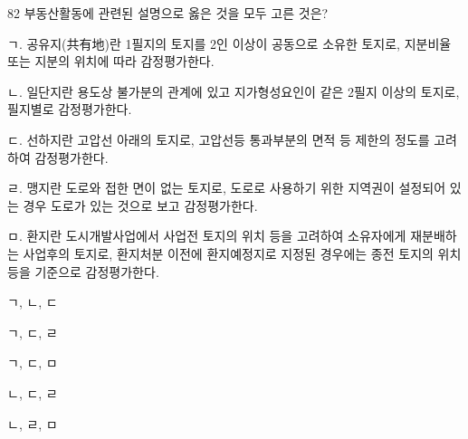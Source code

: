 \begin{question}{82}
부동산활동에 관련된 설명으로 옳은 것을 모두 고른 것은?
\begin{framedtext}
ㄱ. 공유지(共有地)란 1필지의 토지를 2인 이상이 공동으로 소유한 토지로, 지분비율 또는 지분의 위치에 따라 감정평가한다. \par
ㄴ. 일단지란 용도상 불가분의 관계에 있고 지가형성요인이 같은 2필지 이상의 토지로, 필지별로 감정평가한다. \par
ㄷ. 선하지란 고압선 아래의 토지로, 고압선등 통과부분의 면적 등 제한의 정도를 고려하여 감정평가한다. \par
ㄹ. 맹지란 도로와 접한 면이 없는 토지로, 도로로 사용하기 위한 지역권이 설정되어 있는 경우 도로가 있는 것으로 보고 감정평가한다. \par
ㅁ. 환지란 도시개발사업에서 사업전 토지의 위치 등을 고려하여 소유자에게 재분배하는 사업후의 토지로, 환지처분 이전에 환지예정지로 지정된 경우에는 종전 토지의 위치 등을 기준으로 감정평가한다.
\end{framedtext}
\begin{choices}
  \item ㄱ, ㄴ, ㄷ
  \item ㄱ, ㄷ, ㄹ
  \item ㄱ, ㄷ, ㅁ
  \item ㄴ, ㄷ, ㄹ
  \item ㄴ, ㄹ, ㅁ
\end{choices}
\end{question}
